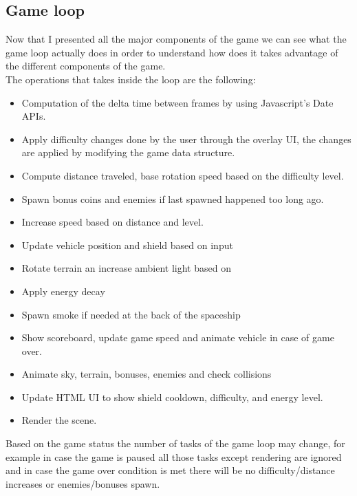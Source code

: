\documentclass[a4paper,11pt]{article}
\begin{document}
\subsection{Game loop}
Now that I presented all the major components of the game we can see what the game loop actually does in order to understand how does it takes advantage of the different components of the game.\\
The operations that takes inside the loop are the following:
\begin{itemize}
    \item Computation of the delta time between frames by using Javascript's Date APIs.
    \item Apply difficulty changes done by the user through the overlay UI, the changes are applied by modifying the game data structure.
    \item Compute distance traveled, base rotation speed based on the difficulty level.
    \item Spawn bonus coins and enemies if last spawned happened too long ago.
    \item Increase speed based on distance and level.
    \item Update vehicle position and shield based on input
    \item Rotate terrain an increase ambient light based on
    \item Apply energy decay
    \item Spawn smoke if needed at the back of the spaceship
    \item Show scoreboard, update game speed and animate vehicle in case of game over.
    \item Animate sky, terrain, bonuses, enemies and check collisions
    \item Update HTML UI to show shield cooldown, difficulty, and energy level.
    \item Render the scene.
\end{itemize}
Based on the game status the number of tasks of the game loop may change, for example in case the game is paused all those tasks except rendering are ignored and in case the game over condition is met there will be no difficulty/distance increases or enemies/bonuses spawn.
\newpage
\end{document}
